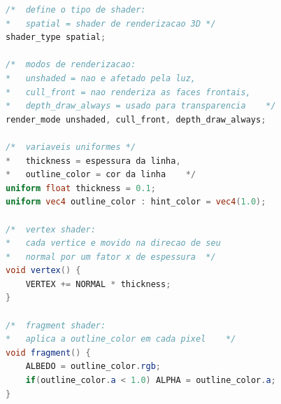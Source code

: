 \pagebreak



\begin{lstlisting}[language=GLSL, caption={\label{cf:outline} Shader GLSL 3D simples para efeito de contorno}]
/*	define o tipo de shader:
*	spatial = shader de renderizacao 3D	*/
shader_type spatial;

/*	modos de renderizacao: 
*	unshaded = nao e afetado pela luz,
*	cull_front = nao renderiza as faces frontais,
*	depth_draw_always = usado para transparencia	*/
render_mode unshaded, cull_front, depth_draw_always; 

/*	variaveis uniformes	*/
*	thickness = espessura da linha,
*	outline_color = cor da linha	*/
uniform float thickness = 0.1;
uniform vec4 outline_color : hint_color = vec4(1.0);

/*	vertex shader:
*	cada vertice e movido na direcao de seu 
*	normal por um fator x de espessura	*/
void vertex() {
	VERTEX += NORMAL * thickness;
}

/*	fragment shader:
*	aplica a outline_color em cada pixel	*/
void fragment() {
	ALBEDO = outline_color.rgb;
	if(outline_color.a < 1.0) ALPHA = outline_color.a;
}
\end{lstlisting}

	\begin{figure}[htp]
		\centering
	\end{figure}

\hfill

